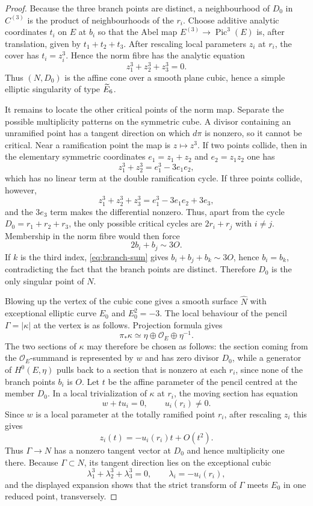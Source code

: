 \begin{proof}
Because the three branch points are distinct, a neighbourhood of $D_0$ in
$C^{(3)}$ is the product of neighbourhoods of the $r_i$.  Choose additive
analytic coordinates $t_i$ on $E$ at $b_i$ so that the Abel map
$E^{(3)}\to\operatorname{Pic}^3(E)$ is, after translation, given by
$t_1+t_2+t_3$.  After rescaling local parameters $z_i$ at $r_i$, the cover
has $t_i=z_i^3$.  Hence the norm fibre has the analytic equation
\[
 z_1^3+z_2^3+z_3^3=0.
\]
Thus $(N,D_0)$ is the affine cone over a smooth plane cubic, hence a simple
elliptic singularity of type $\widetilde E_6$.

It remains to locate the other critical points of the norm map.  Separate
the possible multiplicity patterns on the symmetric cube.  A divisor
containing an unramified point
has a tangent direction on which $d\pi$ is nonzero, so it cannot be critical.
Near a ramification point the map is $z\mapsto z^3$.  If two points collide,
then in the elementary symmetric coordinates $e_1=z_1+z_2$ and
$e_2=z_1z_2$ one has
\[
 z_1^3+z_2^3=e_1^3-3e_1e_2,
\]
which has no linear term at the double ramification cycle.  If three points
collide, however,
\[
 z_1^3+z_2^3+z_3^3=e_1^3-3e_1e_2+3e_3,
\]
and the $3e_3$ term makes the differential nonzero.  Thus, apart from the
cycle $D_0=r_1+r_2+r_3$, the only possible critical cycles are
$2r_i+r_j$ with $i\ne j$.  Membership in the norm fibre would then force
\[
 2b_i+b_j\sim3O.
\]
If $k$ is the third index, \eqref{eq:branch-sum} gives
$b_i+b_j+b_k\sim3O$, hence $b_i=b_k$, contradicting the fact that the branch
points are distinct.  Therefore $D_0$ is the only singular point of $N$.

Blowing up the vertex of the cubic cone gives a smooth surface $\widehat N$
with exceptional elliptic curve $E_0$ and $E_0^2=-3$.  The local behaviour
of the pencil $\Gamma=|\kappa|$ at the vertex is as follows.  Projection
formula gives
\[
 \pi_*\kappa\simeq\eta\oplus\mathcal O_E\oplus\eta^{-1}.
\]
The two sections of $\kappa$ may therefore be chosen as follows: the section
coming from the $\mathcal O_E$-summand is represented by $w$ and has zero
divisor $D_0$, while a generator of $H^0(E,\eta)$ pulls back to a section
that is nonzero at each $r_i$, since none of the branch points $b_i$ is $O$.  Let $t$ be the affine parameter of the pencil
centred at the member $D_0$.  In a local trivialization of $\kappa$ at
$r_i$, the moving section has equation
\[
 w+t u_i=0,\qquad u_i(r_i)\ne0.
\]
Since $w$ is a local parameter at the totally ramified point $r_i$, after
rescaling $z_i$ this gives
\[
 z_i(t)=-u_i(r_i)t+O(t^2).
\]
Thus $\Gamma\to N$ has a nonzero tangent vector at $D_0$ and hence
multiplicity one there.  Because $\Gamma\subset N$, its tangent direction
lies on the exceptional cubic
\[
 \lambda_1^3+\lambda_2^3+\lambda_3^3=0,
 \qquad \lambda_i=-u_i(r_i),
\]
and the displayed expansion shows that the strict transform of $\Gamma$
meets $E_0$ in one reduced point, transversely.


\end{proof}
